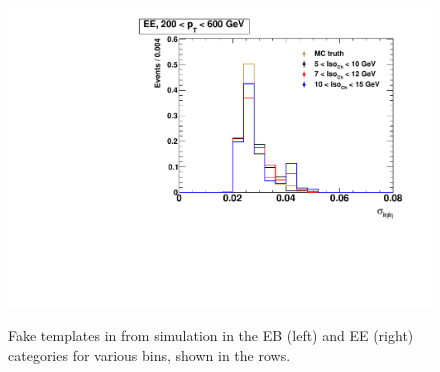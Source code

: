 \begin{figure}[!htbp]
\begin{multicols}{2}
		\includegraphics[scale=0.29]{figures/closure_test_fake_template_sieie_EE_pt200To600_sample_all.pdf} \\
	\end{multicols}
	\vspace{-0.5cm} %
  	\caption{Fake templates in \sieie from simulation in the EB (left) and EE (right) categories for various \pt bins, shown in the rows.}
  	\label{fig:all_mc_sieie_fake_templates}
\end{figure}


